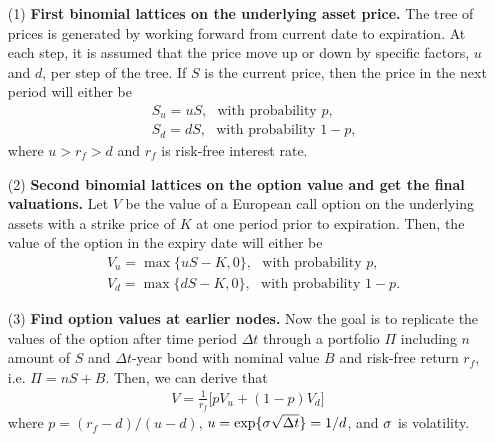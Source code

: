 \documentclass[11pt,letter]{article}
\def\D{\Delta} \def\G{\Gamma} \def\W{\Omega} \def\P{\Phi} \def\L{\Lambda} \def\Th{\Theta} \def\z{\zeta}
\theoremstyle{definition}
\theoremstyle{remark}
\numberwithin{equation}{section}
\begin{document}
\begin{itemize}
    \item[(1)] \textbf{First binomial lattices on the underlying asset price.} The tree of prices is generated by working forward from current date to expiration. At each step, it is assumed that the price move up or down by specific factors, $u$ and $d$, per step of the tree. If $S$ is the current price, then the price in the next period will either be
    \begin{align*}
        &S_u=uS,~~~\text{with probability $p$,}\\
        &S_d=dS,~~~\text{with probability $1-p$,}
    \end{align*}
    where $u>r_f>d$ and $r_f$ is risk-free interest rate.
    
    \item[(2)] \textbf{Second binomial lattices on the option value and get the final valuations.} Let $V$ be the value of a European call option on the underlying assets with a strike price of $K$ at one period prior to expiration. Then, the value of the option in the expiry date will either be
    \begin{align*}
        &V_u=\max\{uS-K,0\},~~~\text{with probability $p$,}\\
        &V_d=\max\{dS-K,0\},~~~\text{with probability $1-p$.}
    \end{align*}
    
    \item[(3)] \textbf{Find option values at earlier nodes.} Now the goal is to replicate the values of the option after time period $\D t$ through a portfolio $\Pi$ including $n$ amount of $S$ and $\D t$-year bond with nominal value $B$ and risk-free return $r_f$, i.e. $\Pi=nS+B$. Then, we can derive that
    \begin{align*}
        V=\frac{1}{r_f}\Big[pV_u+(1-p)V_d\Big]
    \end{align*}
    where $p=(r_f-d)/(u-d)$, $u=\exp\{\s\sqrt{\D t}\}=1/d$, and $\sigma$ is volatility.
    
\end{itemize}
\end{document}

